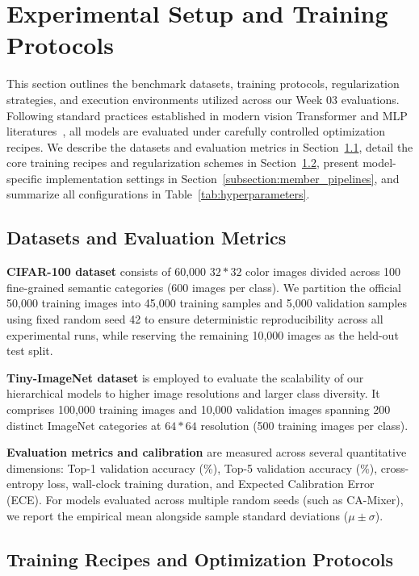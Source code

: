\section{Experimental Setup and Training Protocols}
\label{section:experimental_setup}

This section outlines the benchmark datasets, training protocols, regularization strategies, and execution environments utilized across our Week 03 evaluations. Following standard practices established in modern vision Transformer and MLP literatures~\cite{ding2022repmlp, yu2022metaformer, touvron2021resmlp}, all models are evaluated under carefully controlled optimization recipes. We describe the datasets and evaluation metrics in Section~\ref{subsection:datasets}, detail the core training recipes and regularization schemes in Section~\ref{subsection:recipes}, present model-specific implementation settings in Section~\ref{subsection:member_pipelines}, and summarize all configurations in Table~\ref{tab:hyperparameters}.

\subsection{Datasets and Evaluation Metrics}
\label{subsection:datasets}

\textbf{CIFAR-100 dataset} consists of 60,000 $32*32$ color images divided across 100 fine-grained semantic categories (600 images per class). We partition the official 50,000 training images into 45,000 training samples and 5,000 validation samples using fixed random seed 42 to ensure deterministic reproducibility across all experimental runs, while reserving the remaining 10,000 images as the held-out test split.

\textbf{Tiny-ImageNet dataset} is employed to evaluate the scalability of our hierarchical models to higher image resolutions and larger class diversity. It comprises 100,000 training images and 10,000 validation images spanning 200 distinct ImageNet categories at $64*64$ resolution (500 training images per class).

\textbf{Evaluation metrics and calibration} are measured across several quantitative dimensions: Top-1 validation accuracy (\%), Top-5 validation accuracy (\%), cross-entropy loss, wall-clock training duration, and Expected Calibration Error (ECE). For models evaluated across multiple random seeds (such as CA-Mixer), we report the empirical mean alongside sample standard deviations ($\mu \pm \sigma$).

\subsection{Training Recipes and Optimization Protocols}
\label{subsection:recipes}

